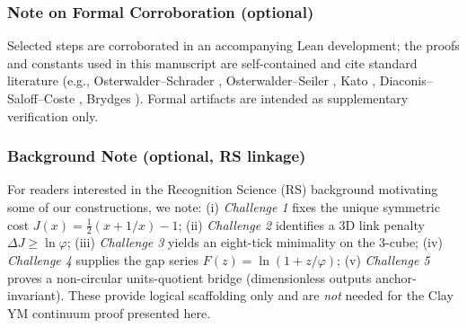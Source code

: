 \documentclass[11pt]{amsart}
\theoremstyle{plain}
\theoremstyle{definition}
\theoremstyle{remark}
\renewcommand{\tfrac}[2]{\textstyle\frac{#1}{#2}}
\begin{document}
\subsubsection*{Note on Formal Corroboration (optional)}
Selected steps are corroborated in an accompanying Lean development; the proofs and constants used in this manuscript are self-contained and cite standard literature (e.g., Osterwalder–Schrader \cite{Osterwalder1973,Osterwalder1975}, Osterwalder–Seiler \cite{OsterwalderSeiler1978}, Kato \cite{Kato1995}, Diaconis–Saloff–Coste \cite{DiaconisSaloffCoste2004}, Brydges \cite{Brydges1978,Brydges1986}). Formal artifacts are intended as supplementary verification only.

\subsubsection*{Background Note (optional, RS linkage)}
For readers interested in the Recognition Science (RS) background motivating some of our constructions, we note: (i) 
\emph{Challenge 1} fixes the unique symmetric cost $J(x)=\tfrac12(x+1/x)-1$; (ii) \emph{Challenge 2} identifies a $3$D link penalty $\Delta J\ge \ln\varphi$; (iii) \emph{Challenge 3} yields an eight-tick minimality on the $3$-cube; (iv) \emph{Challenge 4} supplies the gap series $F(z)=\ln(1+z/\varphi)$; (v) \emph{Challenge 5} proves a non-circular units-quotient bridge (dimensionless outputs anchor-invariant). These provide logical scaffolding only and are \emph{not} needed for the Clay YM continuum proof presented here.
\end{document}

